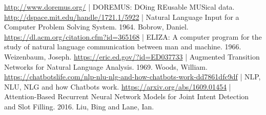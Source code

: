 \documentclass[a4paper,12pt]{report}
\begin{document}
	\begin{thebibliography}{9}
		 \href{http://www.doremus.org/}{http://www.doremus.org/} | DOREMUS: DOing REusable MUSical data.
		 \href{http://dspace.mit.edu/handle/1721.1/5922}{http://dspace.mit.edu/handle/1721.1/5922} | Natural Language Input for a Computer Problem Solving System. 1964. Bobrow, Daniel.
		 \href{https://dl.acm.org/citation.cfm?id=365168}{https://dl.acm.org/citation.cfm?id=365168} | ELIZA: A computer program for the study of natural language communication between man and machine. 1966. Weizenbaum, Joseph.
		 \href{https://eric.ed.gov/?id=ED037733}{https://eric.ed.gov/?id=ED037733} | Augmented Transition Networks for Natural Language Analysis. 1969. Woods, William.
		 \href{https://chatbotslife.com/nlp-nlu-nlg-and-how-chatbots-work-dd7861dfc9df}{https://chatbotslife.com/nlp-nlu-nlg-and-how-chatbots-work-dd7861dfc9df} | NLP, NLU, NLG and how Chatbots work.
		 \href{https://arxiv.org/abs/1609.01454}{https://arxiv.org/abs/1609.01454} | Attention-Based Recurrent Neural Network Models for Joint Intent Detection and Slot Filling. 2016. Liu, Bing and Lane, Ian.
	\end{thebibliography}
\end{document}
